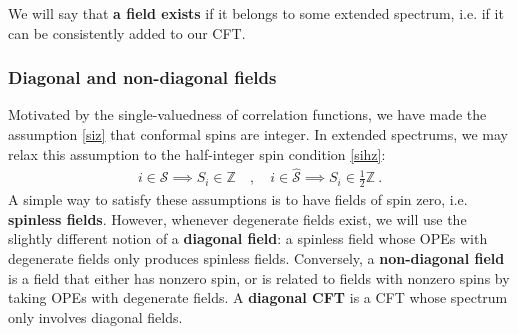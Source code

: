 \documentclass[12pt, a4paper]{article}
\newcommand{\myindex}[1]{\textbf{\boldmath #1}}
\theoremstyle{break}
\begin{document}
We will say that \myindex{a field exists} if it belongs to some extended spectrum, i.e. if it can be consistently added to our CFT. 

\subsubsection{Diagonal and non-diagonal fields}

Motivated by the single-valuedness of correlation functions, we have made the assumption \eqref{siz} that conformal spins are integer. In extended spectrums, we may relax this assumption to the half-integer spin condition \eqref{sihz}:
\begin{align}
 i\in\mathcal{S}\implies S_i\in\mathbb{Z} \quad , \quad i \in \widehat{\mathcal{S}}\implies S_i\in\frac12\mathbb{Z}\ . 
\end{align}
A simple way to satisfy these assumptions is to have fields of spin zero, i.e. \myindex{spinless fields}. However, whenever degenerate fields exist, we will use the slightly different notion of a \myindex{diagonal field}: a spinless field whose OPEs with degenerate fields only produces spinless fields. Conversely, a \myindex{non-diagonal field} is a field that either has nonzero spin, or is related to fields with nonzero spins by taking OPEs with degenerate fields. A \myindex{diagonal CFT} is a CFT whose spectrum only involves diagonal fields.  
\end{document}
